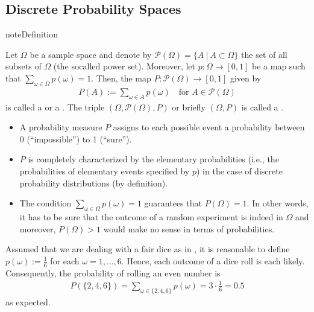 \documentclass[letterpaper,10pt,english]{jupyterBook}
\begin{document}
\subsection{Discrete Probability Spaces}
\label{\detokenize{fund/fundprob:discrete-probability-spaces}}
\begin{sphinxadmonition}{note}{Definition}

\sphinxAtStartPar
Let \(\Omega\) be a  sample space and denote by \(\mathcal{P}(\Omega) = \{A~|~A \subset \Omega\}\) the set of all subsets of \(\Omega\) (the so\sphinxhyphen{}called power set). Moreover, let \(p: \Omega \rightarrow [0, 1]\) be a map such that \(\sum_{\omega \in \Omega} p(\omega) = 1\). Then, the map \(P: \mathcal{P}(\Omega) \rightarrow [0,1]\) given by
\begin{equation*}
\begin{split} P(A) := \sum_{\omega \in A} p(\omega) \quad \text{for } A \in \mathcal{P}(\Omega)\end{split}
\end{equation*}
\sphinxAtStartPar
is called a  or a . The triple \((\Omega, \mathcal{P}(\Omega), P)\) or briefly \((\Omega, P)\) is called a .
\end{sphinxadmonition}
\begin{itemize}
\item {} 
\sphinxAtStartPar
A probability measure \(P\) assigns to each possible event a probability between 0 (“impossible”) to 1 (“sure”).

\item {} 
\sphinxAtStartPar
\(P\) is completely characterized by the elementary probabilities (i.e., the probabilities of elementary events specified by \(p\)) in the case of discrete probability distributions (by definition).

\item {} 
\sphinxAtStartPar
The condition \(\sum_{\omega \in \Omega} p(\omega) = 1\) guarantees that \(P(\Omega) = 1\). In other words, it has to be sure that the outcome of a random experiment is indeed in \(\Omega\) and moreover, \(P(\Omega) > 1\) would make no sense in terms of probabilities.

\end{itemize}

\sphinxAtStartPar
Assumed that we are dealing with a fair dice as in {\hyperref[\detokenize{fund/fundprob:equation-ex-dice}]{}}, it is reasonable to define \(p(\omega):=\frac{1}{6}\) for each \(\omega=1, \dots,6\). Hence, each outcome of a dice roll is each likely. Consequently, the probability of rolling an even number is
\begin{equation*}
\begin{split}P(\{2, 4, 6\}) = \sum_{\omega \in \{2, 4, 6\}} p(\omega) = 3 \cdot \frac{1}{6} = 0.5\end{split}
\end{equation*}
\sphinxAtStartPar
as expected.
\end{document}

